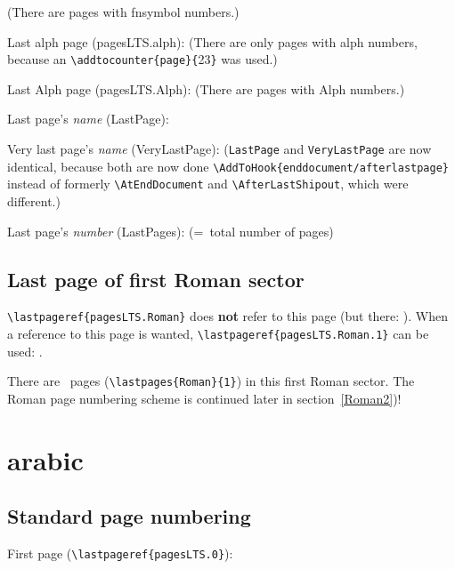 \documentclass[british]{article}[2024/06/29]%
\def\pagesLTSexamplealph{23}
\begin{document}
(There are  pages with fnsymbol numbers.)\bigskip

Last alph page (pagesLTS.alph): 
(There are only  pages with alph numbers,
because an \verb|\addtocounter{page}{|\pagesLTSexamplealph\verb|}| was used.)\bigskip

Last Alph page (pagesLTS.Alph): 
(There are  pages with Alph numbers.)\bigskip

Last page's \textit{name} (LastPage): \bigskip

Very last page's \textit{name} (VeryLastPage): \newline
(\texttt{LastPage} and \texttt{VeryLastPage} are now identical, because both are now done
\verb|\AddToHook{enddocument/afterlastpage}| instead of formerly\newline
\verb|\AtEndDocument| and \verb|\AfterLastShipout|, which were different.)\bigskip

Last page's \textit{number} (LastPages): 
(=~total number of pages)

\newpage
\subsection{Last page of first Roman sector}
\verb|\lastpageref{pagesLTS.Roman}| does \textbf{not}
refer to this page (but there: ).
When a reference to this page is wanted,\newline
\verb|\lastpageref{pagesLTS.Roman.1}| can be used: .\bigskip

There are ~pages (\verb|\lastpages{Roman}{1}|)
in this first Roman sector.\newline
The Roman page numbering scheme is continued later in section~\ref{Roman2})!

\newpage
{}
\section{arabic}
\subsection{Standard page numbering}

First page (\verb|\lastpageref{pagesLTS.0}|):
\bigskip
\end{document}
